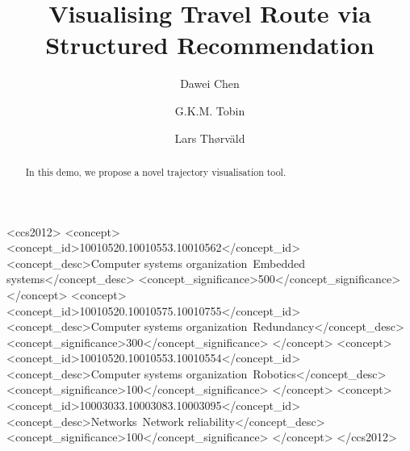 \documentclass[sigconf]{acmart}
\begin{document}
\title{Visualising Travel Route via Structured Recommendation}

\author{Dawei Chen}

\author{G.K.M. Tobin}

\author{Lars Th{\o}rv{\"a}ld}

\renewcommand{\shortauthors}{D. Chen et al.}


\begin{abstract}
In this demo, we propose a novel trajectory visualisation tool. 
\end{abstract}

%
%
\begin{CCSXML}
<ccs2012>
 <concept>
  <concept_id>10010520.10010553.10010562</concept_id>
  <concept_desc>Computer systems organization~Embedded systems</concept_desc>
  <concept_significance>500</concept_significance>
 </concept>
 <concept>
  <concept_id>10010520.10010575.10010755</concept_id>
  <concept_desc>Computer systems organization~Redundancy</concept_desc>
  <concept_significance>300</concept_significance>
 </concept>
 <concept>
  <concept_id>10010520.10010553.10010554</concept_id>
  <concept_desc>Computer systems organization~Robotics</concept_desc>
  <concept_significance>100</concept_significance>
 </concept>
 <concept>
  <concept_id>10003033.10003083.10003095</concept_id>
  <concept_desc>Networks~Network reliability</concept_desc>
  <concept_significance>100</concept_significance>
 </concept>
</ccs2012>  
\end{CCSXML}

\end{document}
